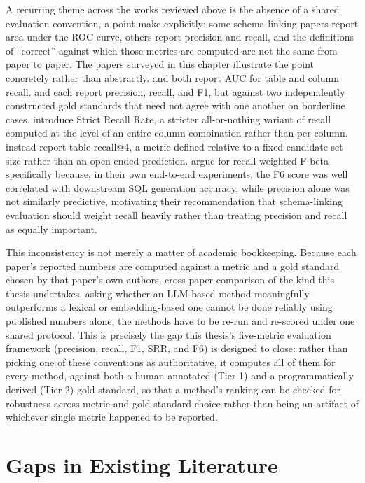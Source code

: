 A recurring theme across the works reviewed above is the absence of a shared evaluation convention, a point \citet{glass2025} make explicitly: some schema-linking papers report area under the ROC curve, others report precision and recall, and the definitions of ``correct'' against which those metrics are computed are not the same from paper to paper. The papers surveyed in this chapter illustrate the point concretely rather than abstractly. \citet{li2023} and \citet{dong2023} both report AUC for table and column recall. \citet{lei2020} and \citet{taniguchi2021} each report precision, recall, and F1, but against two independently constructed gold standards that need not agree with one another on borderline cases. \citet{cao2024} introduce Strict Recall Rate, a stricter all-or-nothing variant of recall computed at the level of an entire column combination rather than per-column. \citet{yang2024} instead report table-recall@4, a metric defined relative to a fixed candidate-set size rather than an open-ended prediction. \citet{glass2025} argue for recall-weighted F-beta specifically because, in their own end-to-end experiments, the F6 score was well correlated with downstream SQL generation accuracy, while precision alone was not similarly predictive, motivating their recommendation that schema-linking evaluation should weight recall heavily rather than treating precision and recall as equally important.

This inconsistency is not merely a matter of academic bookkeeping. Because each paper's reported numbers are computed against a metric and a gold standard chosen by that paper's own authors, cross-paper comparison of the kind this thesis undertakes, asking whether an LLM-based method meaningfully outperforms a lexical or embedding-based one cannot be done reliably using published numbers alone; the methods have to be re-run and re-scored under one shared protocol. This is precisely the gap this thesis's five-metric evaluation framework (precision, recall, F1, SRR, and F6) is designed to close: rather than picking one of these conventions as authoritative, it computes all of them for every method, against both a human-annotated (Tier 1) and a programmatically derived (Tier 2) gold standard, so that a method's ranking can be checked for robustness across metric and gold-standard choice rather than being an artifact of whichever single metric happened to be reported.

\section{Gaps in Existing Literature}\label{sec:2-5}

